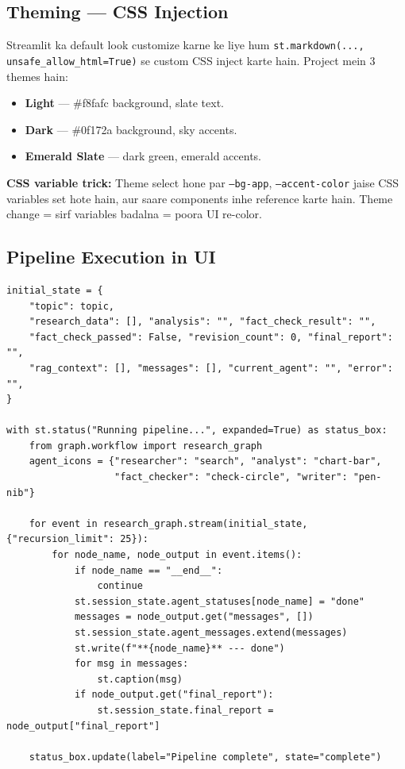 \documentclass[11pt, a4paper]{article}
\begin{document}
\subsection{Theming --- CSS Injection}

\begin{conceptbox}
Streamlit ka default look customize karne ke liye hum \texttt{st.markdown(..., unsafe\_allow\_html=True)} se custom CSS inject karte hain. Project mein 3 themes hain:
\begin{itemize}
\item \textbf{Light} --- \#f8fafc background, slate text.
\item \textbf{Dark} --- \#0f172a background, sky accents.
\item \textbf{Emerald Slate} --- dark green, emerald accents.
\end{itemize}

\textbf{CSS variable trick:} Theme select hone par \texttt{--bg-app}, \texttt{--accent-color} jaise CSS variables set hote hain, aur saare components inhe reference karte hain. Theme change = sirf variables badalna = poora UI re-color.
\end{conceptbox}

\subsection{Pipeline Execution in UI}

\begin{lstlisting}[style=pythonstyle, caption={app.py --- Streaming Execution}]
initial_state = {
    "topic": topic,
    "research_data": [], "analysis": "", "fact_check_result": "",
    "fact_check_passed": False, "revision_count": 0, "final_report": "",
    "rag_context": [], "messages": [], "current_agent": "", "error": "",
}

with st.status("Running pipeline...", expanded=True) as status_box:
    from graph.workflow import research_graph
    agent_icons = {"researcher": "search", "analyst": "chart-bar",
                   "fact_checker": "check-circle", "writer": "pen-nib"}

    for event in research_graph.stream(initial_state, {"recursion_limit": 25}):
        for node_name, node_output in event.items():
            if node_name == "__end__":
                continue
            st.session_state.agent_statuses[node_name] = "done"
            messages = node_output.get("messages", [])
            st.session_state.agent_messages.extend(messages)
            st.write(f"**{node_name}** --- done")
            for msg in messages:
                st.caption(msg)
            if node_output.get("final_report"):
                st.session_state.final_report = node_output["final_report"]

    status_box.update(label="Pipeline complete", state="complete")
\end{lstlisting}
\end{document}
